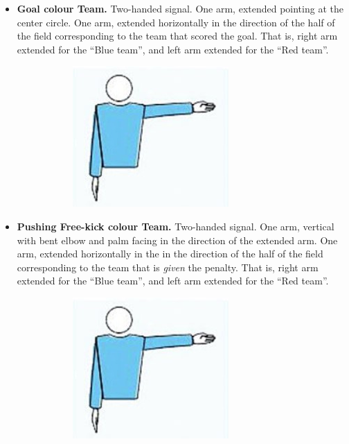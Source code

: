 \begin{itemize}
            \item \textbf{Goal \textlangle{}colour\textrangle{}  Team.}
            Two-handed signal. One arm, extended pointing at the center circle. One arm, extended horizontally in the direction of the half of the field corresponding to the team that scored the goal. That is, right arm extended for the ``Blue team'', and left arm extended for the ``Red team''.
            \begin{figure}[ht!]
                \centering
                \begin{subfigure}{.33\textwidth}
                  \includegraphics{figs/kick-off_referee.jpg}
                \end{subfigure}%
            \end{figure}


            \item \textbf{Pushing Free-kick \textlangle{}colour\textrangle{}  Team.}
            Two-handed signal. One arm, vertical with bent elbow and palm facing in the direction of the extended arm. One arm, extended horizontally in the in the direction of the half of the field corresponding to the team that is \emph{given} the penalty. That is, right arm extended for the ``Blue team'', and left arm extended for the ``Red team''.
            \begin{figure}[ht!]
                \centering
                \begin{subfigure}{.33\textwidth}
                  \includegraphics{figs/kick-off_referee.jpg}
                \end{subfigure}%
            \end{figure}


\end{itemize}
